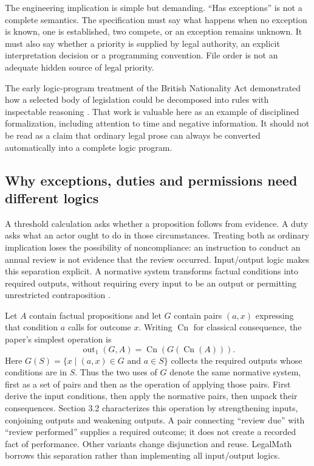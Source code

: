 The engineering implication is simple but demanding. ``Has exceptions'' is
not a complete semantics. The specification must say what happens when no
exception is known, one is established, two compete, or an exception remains
unknown. It must also say whether a priority is supplied by legal authority,
an explicit interpretation decision or a programming convention. File order
is not an adequate hidden source of legal priority.

The early logic-program treatment of the British Nationality Act demonstrated
how a selected body of legislation could be decomposed into rules with
inspectable reasoning \citep{sergot1986}. That work is valuable here as an
example of disciplined formalization, including attention to time and negative
information. It should not be read as a claim that ordinary legal prose can
always be converted automatically into a complete logic program.

\subsection{Why exceptions, duties and permissions need different logics}
\label{merge:P-02a-foundations:00}


A threshold calculation asks whether a proposition follows from evidence. A duty
asks what an actor ought to do in those circumstances. Treating both as ordinary
implication loses the possibility of noncompliance: an instruction to conduct an
annual review is not evidence that the review occurred. Input/output logic makes
this separation explicit. A normative system transforms factual conditions into
required outputs, without requiring every input to be an output or permitting
unrestricted contraposition \citep[secs.~2--3]{inputoutput2000}.

Let $A$ contain factual propositions and let $G$ contain pairs $(a,x)$ expressing
that condition $a$ calls for outcome $x$. Writing $\operatorname{Cn}$ for classical
consequence, the paper's simplest operation is
\begin{equation}
 \operatorname{out}_1(G,A)
 =\operatorname{Cn}\!\left(G\!\left(\operatorname{Cn}(A)\right)\right).
 \label{eq:io}
\end{equation}
Here $G(S)=\{x\mid (a,x)\in G\text{ and }a\in S\}$ collects the required
outputs whose conditions are in $S$. Thus the two uses of $G$ denote the same
normative system, first as a set of pairs and then as the operation of applying
those pairs. First derive the input conditions, then apply the normative pairs, then unpack
their consequences. Section 3.2 characterizes this operation by strengthening
inputs, conjoining outputs and weakening outputs. A pair connecting ``review
due'' with ``review performed'' supplies a required outcome; it does not create
a recorded fact of performance. Other variants change disjunction and reuse.
LegalMath borrows this separation rather than implementing all input/output logics.

